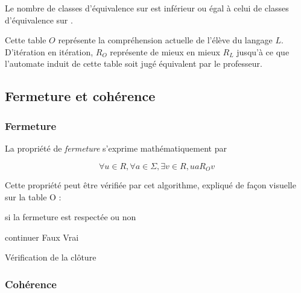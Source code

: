 	\begin{corollary}
		Le nombre de classes d'équivalence sur \ro est inférieur ou égal à celui de classes d'équivalence sur \rl.
	\end{corollary}

	Cette table $O$ représente la compréhension actuelle de l'élève du langage $L$. D'itération en itération, $R_O$ représente de mieux en mieux $R_L$ jusqu'à ce que l'automate induit de cette table soit jugé équivalent par le professeur.





\subsection{Fermeture et cohérence}

\subsubsection*{Fermeture}
La propriété de \emph{fermeture} s'exprime mathématiquement par

$$ \forall u \in R, \forall a \in \Sigma, \exists v \in R, ua R_O v$$

Cette propriété peut être vérifiée par cet algorithme, expliqué de façon visuelle sur la table O :

\begin{algorithm}[H]
	\begin{algorithmic}[1]
		\ENSURE si la fermeture est respectée ou non

				\STATE continuer
			\ELSE
				\STATE {}
					\RETURN Faux
				\ENDIF
			\ENDIF
		\ENDFOR
		\ENDFOR
		\RETURN Vrai
	\end{algorithmic}
	\caption{Vérification de la clôture}\label{alg:cloture}
\end{algorithm}

\subsubsection*{Cohérence}

